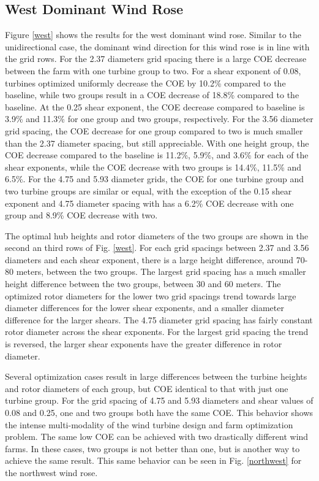 \documentclass[conf]{new-aiaa}
\begin{document}
\subsection{West Dominant Wind Rose}
  Figure \ref{west} shows the results for the west dominant wind rose. Similar to the unidirectional case, the dominant wind direction for this wind rose is in line with the grid rows. For the 2.37 diameters grid spacing there is a large COE decrease between the farm with one turbine group to two. For a shear exponent of 0.08, turbines optimized uniformly decrease the COE by 10.2\% compared to the baseline, while two groups result in a COE decrease of 18.8\% compared to the baseline. At the 0.25 shear exponent, the COE decrease compared to baseline is 3.9\% and 11.3\% for one group and two groups, respectively.
  For the 3.56 diameter grid spacing, the COE decrease for one group compared to two is much smaller than the 2.37 diameter spacing, but still appreciable. With one height group, the COE decrease compared to the baseline is 11.2\%, 5.9\%, and 3.6\% for each of the shear exponents, while the COE decrease with two groups is 14.4\%, 11.5\% and 6.5\%.
For the 4.75 and 5.93 diameter grids, the COE for one turbine group and two turbine groups are similar or equal, with the exception of the 0.15 shear exponent and 4.75 diameter spacing with has a 6.2\% COE decrease with one group and 8.9\% COE decrease with two.
  
  The optimal hub heights and rotor diameters of the two groups are shown in the second an third rows of Fig. \ref{west}. For each grid spacings between 2.37 and 3.56 diameters and each shear exponent, there is a large height difference, around 70-80 meters, between the two groups.  The largest grid spacing has a much smaller height difference between the two groups, between 30 and 60 meters.
  The optimized rotor diameters for the lower two grid spacings trend towards large diameter differences for the lower shear exponents, and a smaller diameter difference for the larger shears. The 4.75 diameter grid spacing has fairly constant rotor diameter across the shear exponents. For the largest grid spacing the trend is reversed, the larger shear exponents have the greater difference in rotor diameter.
  
   Several optimization cases result in large differences between the turbine heights and rotor diameters of each group, but COE identical to that with just one turbine group. For the grid spacing of 4.75 and 5.93 diameters and shear values of 0.08 and 0.25, one and two groups both have the same COE. This behavior shows the intense multi-modality of the wind turbine design and farm optimization problem. The same low COE can be achieved with two drastically different wind farms. In these cases, two groups is not better than one, but is another way to achieve the same result. This same behavior can be seen in Fig. \ref{northwest} for the northwest wind rose.
    
\end{document}
